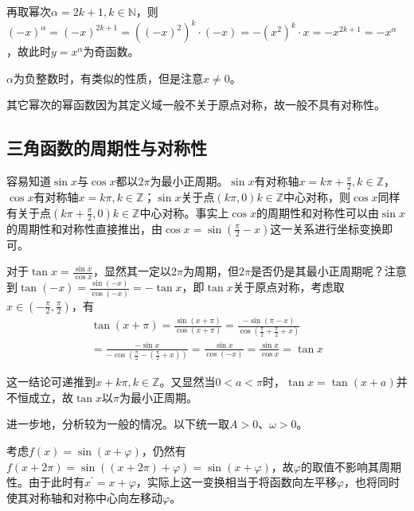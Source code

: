 再取幂次\(\alpha = 2 k + 1 , k \in \mathbb{N}\)，则\({\left( - x \right)}^{\alpha} = {\left( - x \right)}^{2 k + 1} = {\left( {\left( - x \right)}^{2} \right)}^{k} \cdot \left( - x \right) = - {\left( x^{2} \right)}^{k} \cdot x = - x^{2 k + 1} = - x^{\alpha}\)，故此时\(y = x^{\alpha}\)为奇函数。

\(\alpha\)为负整数时，有类似的性质，但是注意\(x \ne 0\)。

其它幂次的幂函数因为其定义域一般不关于原点对称，故一般不具有对称性。


\subsection{三角函数的周期性与对称性}
容易知道\(\sin x\)与\(\cos x\)都以\(2 \pi\)为最小正周期。\(\sin x\)有对称轴\(x = k \pi + \frac{\pi}{2} , k \in \mathbb{Z}\)，\(\cos x\)有对称轴\(x = k \pi , k \in \mathbb{Z}\)；\(\sin x\)关于点\(\left( k \pi , 0 \right) k \in \mathbb{Z}\)中心对称，则\(\cos x\)同样有关于点\(\left( k \pi + \frac{\pi}{2} , 0 \right) k \in \mathbb{Z}\)中心对称。事实上\(\cos x\)的周期性和对称性可以由\(\sin x\)的周期性和对称性直接推出，由\(\cos x = \sin \left( \frac{\pi}{2} - x \right)\)这一关系进行坐标变换即可。

对于\(\tan x = \frac{\sin x}{\cos x}\)，显然其一定以\(2 \pi\)为周期，但\(2 \pi\)是否仍是其最小正周期呢？注意到\(\tan \left( - x \right) = \frac{\sin \left( - x \right)}{\cos \left( - x \right)} = - \tan x\)，即\(\tan x\)关于原点对称，考虑取\(x \in \left( - \frac{\pi}{2} , \frac{\pi}{2} \right)\)，有
\begin{multline}
\tan \left( x + \pi \right) = \frac{\sin \left( x + \pi \right)}{\cos \left( x + \pi \right)} = \frac{- \sin \left( \pi - x \right)}{\cos \left( \frac{\pi}{2} + \frac{\pi}{2} + x \right)} \\
= \frac{- \sin x}{- \cos \left( \frac{\pi}{2} - \left( \frac{\pi}{2} + x \right) \right)} = \frac{\sin x}{\cos \left( - x \right)} = \frac{\sin x}{\cos x} = \tan x
\end{multline}

这一结论可递推到\(x + k \pi , k \in \mathbb{Z}\)。又显然当\(0 < a < \pi\)时，\(\tan x = \tan \left( x + a \right)\)并不恒成立，故\(\tan x\)以\(\pi\)为最小正周期。

进一步地，分析较为一般的情况。以下统一取\(A>0\)、\(\omega>0\)。

考虑\(f(x) = \sin \left( x + \varphi \right)\)，仍然有\(f(x + 2 \pi) = \sin \left( \left( x + 2 \pi \right) + \varphi \right) = \sin \left( x + \varphi \right)\)，故\(\varphi\)的取值不影响其周期性。由于此时有\(x^{'} = x + \varphi\)，实际上这一变换相当于将函数向左平移\(\varphi\)，也将同时使其对称轴和对称中心向左移动\(\varphi\)。


